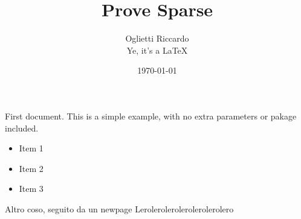 \documentclass{article}
\author{Oglietti Riccardo \\ Ye, it's a \LaTeX{}}
\title{Prove Sparse}
\date{\today}
\begin{document}
    \maketitle
    First document. This is a simple example, with no extra
    parameters or pakage included.
    \begin{itemize}
        \item Item 1
        \item Item 2
        \item Item 3
    \end{itemize}
    Altro coso, seguito da un newpage
    \newpage
    Lerolerolerolerolerolerolero
\end{document}
